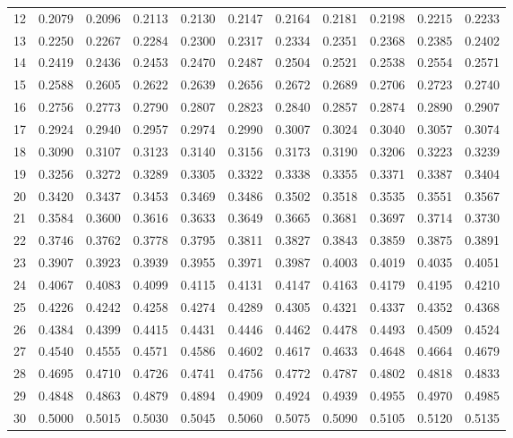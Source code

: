 {\begin{tabular}{|c|cccccccccc|}
12 & 0.2079 & 0.2096 & 0.2113 & 0.2130 & 0.2147 & 0.2164 & 0.2181 & 0.2198 & 0.2215 & 0.2233 \\
13 & 0.2250 & 0.2267 & 0.2284 & 0.2300 & 0.2317 & 0.2334 & 0.2351 & 0.2368 & 0.2385 & 0.2402 \\
14 & 0.2419 & 0.2436 & 0.2453 & 0.2470 & 0.2487 & 0.2504 & 0.2521 & 0.2538 & 0.2554 & 0.2571 \\
\hline
15 & 0.2588 & 0.2605 & 0.2622 & 0.2639 & 0.2656 & 0.2672 & 0.2689 & 0.2706 & 0.2723 & 0.2740 \\
16 & 0.2756 & 0.2773 & 0.2790 & 0.2807 & 0.2823 & 0.2840 & 0.2857 & 0.2874 & 0.2890 & 0.2907 \\
17 & 0.2924 & 0.2940 & 0.2957 & 0.2974 & 0.2990 & 0.3007 & 0.3024 & 0.3040 & 0.3057 & 0.3074 \\
18 & 0.3090 & 0.3107 & 0.3123 & 0.3140 & 0.3156 & 0.3173 & 0.3190 & 0.3206 & 0.3223 & 0.3239 \\
19 & 0.3256 & 0.3272 & 0.3289 & 0.3305 & 0.3322 & 0.3338 & 0.3355 & 0.3371 & 0.3387 & 0.3404 \\
\hline
20 & 0.3420 & 0.3437 & 0.3453 & 0.3469 & 0.3486 & 0.3502 & 0.3518 & 0.3535 & 0.3551 & 0.3567 \\
21 & 0.3584 & 0.3600 & 0.3616 & 0.3633 & 0.3649 & 0.3665 & 0.3681 & 0.3697 & 0.3714 & 0.3730 \\
22 & 0.3746 & 0.3762 & 0.3778 & 0.3795 & 0.3811 & 0.3827 & 0.3843 & 0.3859 & 0.3875 & 0.3891 \\
23 & 0.3907 & 0.3923 & 0.3939 & 0.3955 & 0.3971 & 0.3987 & 0.4003 & 0.4019 & 0.4035 & 0.4051 \\
24 & 0.4067 & 0.4083 & 0.4099 & 0.4115 & 0.4131 & 0.4147 & 0.4163 & 0.4179 & 0.4195 & 0.4210 \\
\hline
25 & 0.4226 & 0.4242 & 0.4258 & 0.4274 & 0.4289 & 0.4305 & 0.4321 & 0.4337 & 0.4352 & 0.4368 \\
26 & 0.4384 & 0.4399 & 0.4415 & 0.4431 & 0.4446 & 0.4462 & 0.4478 & 0.4493 & 0.4509 & 0.4524 \\
27 & 0.4540 & 0.4555 & 0.4571 & 0.4586 & 0.4602 & 0.4617 & 0.4633 & 0.4648 & 0.4664 & 0.4679 \\
28 & 0.4695 & 0.4710 & 0.4726 & 0.4741 & 0.4756 & 0.4772 & 0.4787 & 0.4802 & 0.4818 & 0.4833 \\
29 & 0.4848 & 0.4863 & 0.4879 & 0.4894 & 0.4909 & 0.4924 & 0.4939 & 0.4955 & 0.4970 & 0.4985 \\
\hline
30 & 0.5000 & 0.5015 & 0.5030 & 0.5045 & 0.5060 & 0.5075 & 0.5090 & 0.5105 & 0.5120 & 0.5135 \\

\end{tabular}}
